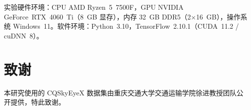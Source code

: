 \documentclass[preprint,review,12pt,a4paper]{elsarticle}
\begin{document}
实验硬件环境：CPU AMD Ryzen~5~7500F，GPU NVIDIA GeForce~RTX~4060~Ti（8~GB 显存），内存 32~GB DDR5（2$\times$16~GB），操作系统 Windows~11。软件环境：Python~3.10，TensorFlow~2.10.1（CUDA~11.2 / cuDNN~8）。

\section*{致谢}
本研究使用的 CQSkyEyeX 数据集由重庆交通大学交通运输学院徐进教授团队公开提供\cite{C17}，特此致谢。



\end{document}
